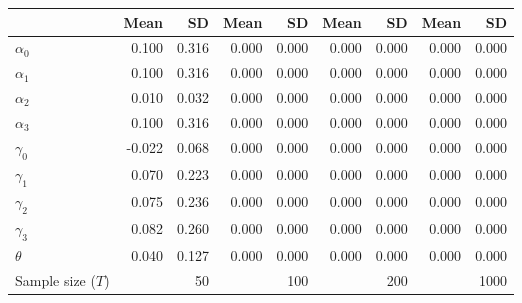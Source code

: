 
\begin{tabular}[t]{lrrrrrrrr}
\toprule
  & Mean & SD & Mean  & SD  & Mean   & SD   & Mean    & SD   \\
\midrule
$\alpha_{0}$ & 0.100 & 0.316 & 0.000 & 0.000 & 0.000 & 0.000 & 0.000 & 0.000\\
$\alpha_{1}$ & 0.100 & 0.316 & 0.000 & 0.000 & 0.000 & 0.000 & 0.000 & 0.000\\
$\alpha_{2}$ & 0.010 & 0.032 & 0.000 & 0.000 & 0.000 & 0.000 & 0.000 & 0.000\\
$\alpha_{3}$ & 0.100 & 0.316 & 0.000 & 0.000 & 0.000 & 0.000 & 0.000 & 0.000\\
$\gamma_{0}$ & -0.022 & 0.068 & 0.000 & 0.000 & 0.000 & 0.000 & 0.000 & 0.000\\
$\gamma_{1}$ & 0.070 & 0.223 & 0.000 & 0.000 & 0.000 & 0.000 & 0.000 & 0.000\\
$\gamma_{2}$ & 0.075 & 0.236 & 0.000 & 0.000 & 0.000 & 0.000 & 0.000 & 0.000\\
$\gamma_{3}$ & 0.082 & 0.260 & 0.000 & 0.000 & 0.000 & 0.000 & 0.000 & 0.000\\
$\theta$ & 0.040 & 0.127 & 0.000 & 0.000 & 0.000 & 0.000 & 0.000 & 0.000\\
Sample size ($T$) &  & 50 &  & 100 &  & 200 &  & 1000\\
\bottomrule
\end{tabular}

